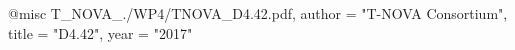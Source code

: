 @misc{ T_NOVA_./WP4/TNOVA_D4.42.pdf,
       author = "T-NOVA Consortium",
       title = "D4.42",
       year = "2017" }
